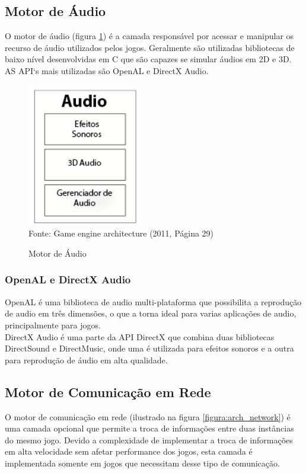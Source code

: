 \documentclass[12pt,	openright, twoside,	a4paper, english, french, spanish, brazil]{abntex2}
\begin{document}
\subsection{Motor de Áudio}
O motor de áudio (figura \ref{figura:arch_audio}) é a camada responsável por acessar e manipular os recurso de áudio utilizados pelos jogos. Geralmente são utilizadas bibliotecas de baixo nível desenvolvidas em C que são capazes se simular áudios em 2D e 3D. AS API`s mais utilizadas são OpenAL e DirectX Audio.

\begin{figure}[H]
\centering
\caption{Motor de Áudio}
\includegraphics[width=5cm]{imagens/arch-audio.png}
\\
\small{Fonte: Game engine architecture (2011, Página 29)}
\label{figura:arch_audio}
\end{figure}

\subsubsection{OpenAL e DirectX Audio}
OpenAL é uma biblioteca de audio multi-plataforma que possibilita a reprodução de audio em três dimensões, o que a torna ideal para varias aplicações de audio, principalmente para jogos. \cite{hiebert}
\\
DirectX Audio é uma parte da API DirectX que combina duas bibliotecas DirectSound e DirectMusic, onde uma é utilizada para efeitos sonoros e a outra para reprodução de áudio em alta qualidade.

\subsection{Motor de Comunicação em Rede}
O motor de comunicação em rede (ilustrado na figura \ref{figura:arch_network}) é uma camada opcional que permite a troca de informações entre duas instâncias do mesmo jogo. Devido a complexidade de implementar a troca de informações em alta velocidade sem afetar performance dos jogos, esta camada é implementada somente em jogos que necessitam desse tipo de comunicação.
\end{document}
